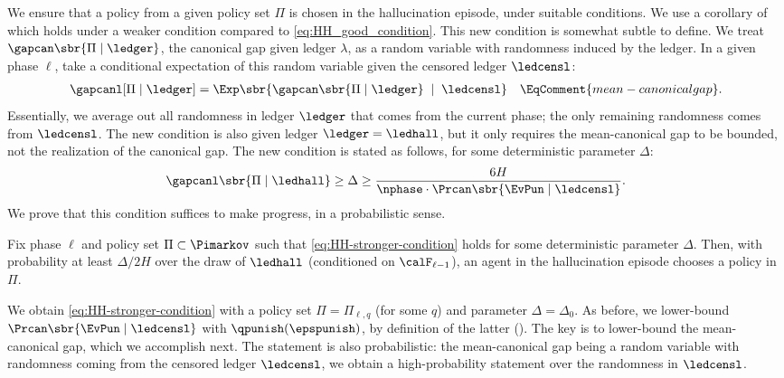 We ensure that a policy from a given policy set $\Pi$ is chosen in the hallucination episode, under suitable conditions. We use a corollary of  which holds under a weaker condition compared to  \eqref{eq:HH_good_condition}. This new condition is somewhat subtle to define. We treat
    $\gapcan\sbr{\Pi \mid \ledger}$,
the canonical gap given ledger $\lambda$, as a random variable with randomness induced by the ledger. In a given phase $\ell$, take a conditional expectation of this random variable given the censored ledger $\ledcensl$:
\begin{align}\label{eq:mean-canonical-gap-defn}
\gapcanl[\Pi\mid \ledger]
    &= \Exp\sbr{ \gapcan\sbr{\Pi \mid \ledger} \;\mid\; \ledcensl }
    &\EqComment{mean-canonical gap}.
\end{align}
Essentially, we average out all randomness in ledger $\ledger$ that comes from the current phase; the only remaining randomness comes from $\ledcensl$. The new condition is also given ledger $\ledger = \ledhall$, but it only requires the mean-canonical gap to be bounded, not the realization of the canonical gap. The new condition is stated as follows, for some deterministic parameter $\Delta$:
\begin{align}\label{eq:HH-stronger-condition}
\gapcanl\sbr{\Pi \mid \ledhall}
    \geq \Delta
    \geq \frac{6H}{\nphase \cdot \Prcan\sbr{\EvPun \mid \ledcensl}}.
\end{align}
We prove that this condition suffices to make progress, in a probabilistic sense.

\begin{lemma}\label{cor:mdp_hh}
Fix phase $\ell$ and policy set $\Pi \subset \Pimarkov$ such that \eqref{eq:HH-stronger-condition} holds for some deterministic parameter $\Delta$. Then, with probability at least $\Delta/2H$ over the draw of $\ledhall$ (conditioned on $\calF_{\ell-1}$), an agent in the hallucination episode chooses a policy in $\Pi$.
\end{lemma}


We obtain \eqref{eq:HH-stronger-condition} with a policy set $\Pi = \Pi_{\ell,q}$ (for some $q$) and parameter $\Delta = \Delta_0$. As before, we lower-bound
    $\Prcan\sbr{\EvPun \mid \ledcensl}$
with  $\qpunish(\epspunish)$, by definition of the latter (). The key is to lower-bound the mean-canonical gap, which we accomplish next. The statement is also probabilistic: the mean-canonical gap being a random variable with randomness coming from the censored ledger $\ledcensl$, we obtain a high-probability statement over the randomness in $\ledcensl$.

